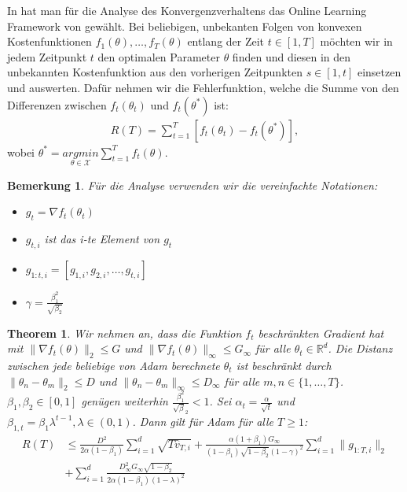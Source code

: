 \documentclass[12pt,titlepage,headsepline]{article}
\newtheorem*{theorem-non}{Theorem}
\newtheorem*{bemerkung*}{Bemerkung}
\begin{document}
      In \cite{kingma_adam_2017} hat man für die Analyse des Konvergenzverhaltens das Online Learning Framework von \cite{zinkevich_online_2003} gewählt. Bei beliebigen, unbekanten Folgen von konvexen Kostenfunktionen $f_1(\theta),\ldots,f_T(\theta)$ entlang der Zeit $t\in [1,T]$ möchten wir in jedem Zeitpunkt $t$ den optimalen Parameter $\theta$ finden und diesen in den unbekannten Kostenfunktion aus den vorherigen Zeitpunkten $s \in [1,t]$ einsetzen und auswerten. Dafür nehmen wir die Fehlerfunktion, welche die Summe von den Differenzen zwischen $f_t(\theta_t)$ und $f_t(\theta^*)$ ist:
      \begin{align*}
        R(T) = \sum_{t=1}^T [f_t(\theta_t) - f_t(\theta^*)],
      \end{align*}
      wobei $\theta^* = \underset{\theta \in \mathcal{X} }{argmin}  \sum_{t=1}^T f_t(\theta)$.
      \begin{bemerkung*}
        Für die Analyse verwenden wir die vereinfachte Notationen:
        \begin{itemize}
          \item $g_t = \nabla f_t(\theta_t)$
          \item $g_{t,i}$ ist das i-te Element von $g_t$
          \item $g_{1:t,i} = [g_{1,i},g_{2,i},\ldots,g_{t,i}]$
          \item $\gamma = \frac{\beta_1^2}{\sqrt{\beta_2}}$
        \end{itemize}
      \end{bemerkung*}
      \begin{theorem-non}
        \textup{
        Wir nehmen an, dass die Funktion $f_t$ beschränkten Gradient hat mit $\lVert \nabla f_t(\theta) \rVert_2 \leq G$ und $\lVert \nabla f_t(\theta) \rVert_{\infty} \leq G_{\infty}$ für alle $\theta_t \in \mathbb{R}^d$. Die Distanz zwischen jede beliebige von Adam berechnete $\theta_t$ ist beschränkt durch $\lVert \theta_n - \theta_m \rVert_2 \leq D$ und $\lVert \theta_n - \theta_m \rVert_{\infty} \leq D_{\infty}$ für alle $m, n \in \{1,\ldots,T\}$. $\beta_1, \beta_2 \in [0,1]$ genügen weiterhin $\frac{\beta_1^2}{\sqrt \beta_2} < 1$. Sei $\alpha_t = \frac{\alpha}{\sqrt t}$ und $\beta_{1,t} = \beta_1 \lambda^{t-1}, \lambda \in (0,1)$. Dann gilt für Adam für alle $T \geq 1$:
        \begin{align*}
          R(T) & \leq \frac{D^2}{2 \alpha (1-\beta_1)} \sum_{i=1}^d \sqrt{T \hat{v}_{T,i}}+ \frac{\alpha (1+\beta_1)G_{\infty}}{(1-\beta_1)\sqrt{1-\beta_2}(1-\gamma)^2} \sum_{i=1}^d \lVert g_{1:T,i} \rVert_2 \\
          & + \sum_{i=1}^d \frac{D^2_{\infty}G_{\infty}\sqrt{1-\beta_2}}{2 \alpha (1-\beta_1)(1-\lambda)^2}
        \end{align*}
        }
      \end{theorem-non}
\end{document}
